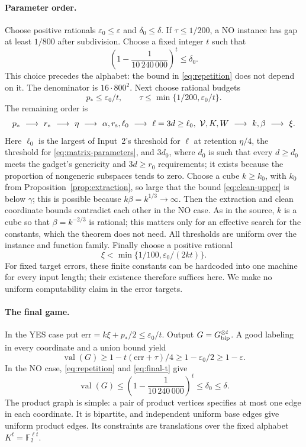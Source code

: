 \documentclass[11pt]{article}
\newcommand{\F}{\mathbb F}
\newcommand{\eps}{\varepsilon}
\newcommand{\val}{\operatorname{val}}
\begin{document}
\paragraph{Parameter order.}
Choose positive rationals $\eps_0\le\eps$ and $\delta_0\le\delta$.
If $\tau\le1/200$, a NO instance has gap at least $1/800$ after subdivision.
Choose a fixed integer $t$ such that
\begin{equation}\label{eq:final-t}
 \left(1-\frac1{10\,240\,000}\right)^t\le\delta_0.
\end{equation}
This choice precedes the alphabet: the bound in \eqref{eq:repetition}
does not depend on it. The denominator is $16\cdot800^2$.
Next choose rational budgets
\[
 p_*\le\eps_0/t,\qquad \tau\le\min\{1/200,\eps_0/t\}.
\]
The remaining order is
\[
 p_*\ \longrightarrow\ r_*\ \longrightarrow\ \eta
 \ \longrightarrow\ \alpha,r_{\rm s},\ell_0
 \ \longrightarrow\ \ell=3d\ge\ell_0,\ \mathcal V,K,W
 \ \longrightarrow\ k,\beta\ \longrightarrow\ \xi.
\]
Here $\ell_0$ is the largest of Input~2's threshold for $\ell$ at retention
$\eta/4$, the threshold for \eqref{eq:matrix-parameters}, and $3d_0$, where
$d_0$ is such that every $d\ge d_0$ meets the gadget's genericity and
$3d\ge r_0$ requirements; it exists because the proportion of nongeneric
subspaces tends to zero.
Choose a cube $k\ge k_0$, with $k_0$ from Proposition~\ref{prop:extraction},
so large that the bound \eqref{eq:clean-upper} is below $\gamma$; this is
possible because $k\beta=k^{1/3}\to\infty$. Then the extraction and clean
coordinate bounds contradict each other in the NO case. As in the source,
$k$ is a cube so that $\beta=k^{-2/3}$ is rational; this matters only for an
effective search for the constants, which the theorem does not need.
All thresholds are uniform over the instance and function family.
Finally choose a positive rational
\[
 \xi<\min\{1/100,\eps_0/(2kt)\}.
\]
For fixed target errors, these finite constants can be hardcoded into one
machine for every input length; their existence therefore suffices here.
We make no uniform computability claim in the error targets.

\paragraph{The final game.}
In the YES case put $\mathrm{err}=k\xi+p_*/2\le\eps_0/t$.
Output $G=G_{\rm bip}^{\otimes t}$. A good labeling in every coordinate and a union
bound yield
\[
 \val(G)\ge1-t(\mathrm{err}+\tau)/4\ge1-\eps_0/2\ge1-\eps.
\]
In the NO case, \eqref{eq:repetition} and \eqref{eq:final-t} give
\[
 \val(G)\le\left(1-\frac1{10\,240\,000}\right)^t\le\delta_0\le\delta.
\]
The product graph is simple: a pair of product vertices specifies at most
one edge in each coordinate. It is bipartite, and independent uniform
base edges give uniform product edges. Its constraints are translations
over the fixed alphabet $K^t=\F_2^{\ell t}$.
\end{document}
